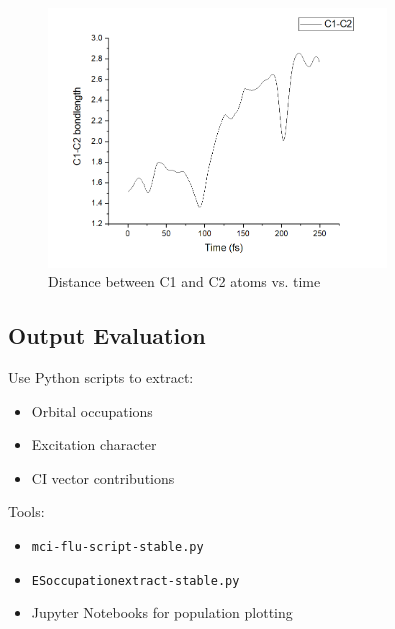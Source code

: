 \begin{figure}[h]
    \centering
    \includegraphics[width=0.8\textwidth]{docs/img/c1_c2_distance.png}
    \caption{Distance between C1 and C2 atoms vs. time}
\end{figure}

\subsection*{Output Evaluation}

Use Python scripts to extract:
\begin{itemize}
  \item Orbital occupations
  \item Excitation character
  \item CI vector contributions
\end{itemize}

Tools:
\begin{itemize}
  \item \texttt{mci-flu-script-stable.py}
  \item \texttt{ESoccupationextract-stable.py}
  \item Jupyter Notebooks for population plotting
\end{itemize}
